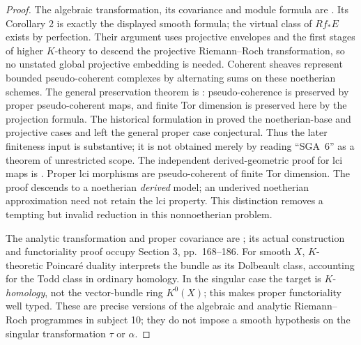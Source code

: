 \begin{proof}
The algebraic transformation, its covariance and module formula are
\cite[Riemann--Roch Theorem (1)--(3), pp.~288--289]{BFultonGillet}.
Its Corollary 2 is exactly the displayed smooth formula; the virtual
class of $Rf_*E$ exists by perfection. Their argument uses projective
envelopes and the first stages of higher $K$-theory to descend the
projective Riemann--Roch transformation, so no unstated global
projective embedding is needed. Coherent sheaves represent bounded
pseudo-coherent complexes by alternating sums on these noetherian
schemes. The general preservation theorem is
\cite[Section 2, Kiehl's finiteness theorem on pp.~5--6;
Proposition 2.1 and Example 2.2(a)]{BLipmanNeeman2007}:
pseudo-coherence is preserved by proper pseudo-coherent maps,
and finite Tor dimension is preserved here by the projection formula.
The historical formulation in
\cite[Expos\'e III, Conjecture 2.1 and Theorem 2.2, pp.~236--237]{BSGA6}
proved the noetherian-base and projective cases and left the general
proper case conjectural. Thus the later finiteness input is substantive;
it is not obtained merely by reading ``SGA~6'' as a theorem of
unrestricted scope.
The independent derived-geometric proof for lci maps is
\cite[Theorems 0.3 and 2.1]{BToen2012}. Proper lci morphisms are
pseudo-coherent of finite Tor dimension. The proof descends to a
noetherian \emph{derived} model; an underived noetherian approximation
need not retain the lci property. This distinction removes a tempting
but invalid reduction in this nonnoetherian problem.

The analytic transformation and proper covariance are
\cite[Riemann--Roch Theorem (a)--(b), p.~149]{BLevy1987}; its actual
construction and functoriality proof occupy Section 3, pp.~168--186.
For smooth $X$, $K$-theoretic Poincar\'e duality interprets the bundle
as its Dolbeault class, accounting for the Todd class in ordinary
homology. In the singular case the target is $K$-\emph{homology},
not the vector-bundle ring $K^0(X)$; this makes proper functoriality
well typed. These are precise versions of the algebraic and analytic
Riemann--Roch programmes in subject 10; they do not impose a smooth
hypothesis on the singular transformation $\tau$ or $\alpha$.
\end{proof}

